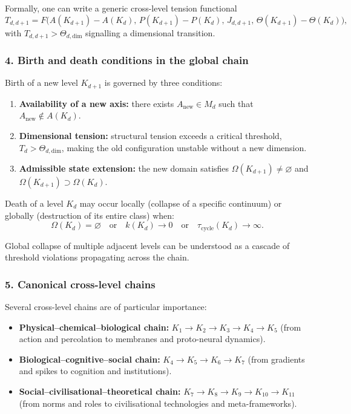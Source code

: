 Formally, one can write a generic cross-level tension functional
\[
T_{d,d+1} = F\bigl(
  A(K_{d+1}) - A(K_d),\,
  P(K_{d+1}) - P(K_d),\,
  J_{d,d+1},\,
  \Theta(K_{d+1}) - \Theta(K_d)
\bigr),
\]
with $T_{d,d+1} > \Theta_{d,\text{dim}}$ signalling a dimensional
transition.

\subsubsection{4. Birth and death conditions in the global chain}

Birth of a new level $K_{d+1}$ is governed by three conditions:
\begin{enumerate}
  \item \textbf{Availability of a new axis:}
        there exists $A_{\text{new}} \in M_d$ such that
        $A_{\text{new}} \notin A(K_d)$.
  \item \textbf{Dimensional tension:}
        structural tension exceeds a critical threshold,
        $T_d > \Theta_{d,\text{dim}}$, making the old configuration unstable
        without a new dimension.
  \item \textbf{Admissible state extension:}
        the new domain satisfies $\Omega(K_{d+1}) \neq \varnothing$ and
        $\Omega(K_{d+1}) \supset \Omega(K_d)$.
\end{enumerate}

Death of a level $K_d$ may occur locally (collapse of a specific
continuum) or globally (destruction of its entire class) when:
\[
\Omega(K_d) = \varnothing
\quad\text{or}\quad
k(K_d) \rightarrow 0
\quad\text{or}\quad
\tau_{\text{cycle}}(K_d) \rightarrow \infty.
\]

Global collapse of multiple adjacent levels can be understood as a cascade
of threshold violations propagating across the chain.

\subsubsection{5. Canonical cross-level chains}

Several cross-level chains are of particular importance:

\begin{itemize}
  \item \textbf{Physical–chemical–biological chain:}
        $K_1 \rightarrow K_2 \rightarrow K_3 \rightarrow K_4 \rightarrow K_5$
        (from action and percolation to membranes and proto-neural
        dynamics).
  \item \textbf{Biological–cognitive–social chain:}
        $K_4 \rightarrow K_5 \rightarrow K_6 \rightarrow K_7$ (from
        gradients and spikes to cognition and institutions).
  \item \textbf{Social–civilisational–theoretical chain:}
        $K_7 \rightarrow K_8 \rightarrow K_9 \rightarrow K_{10} \rightarrow K_{11}$
        (from norms and roles to civilisational technologies and
        meta-frameworks).
\end{itemize}

